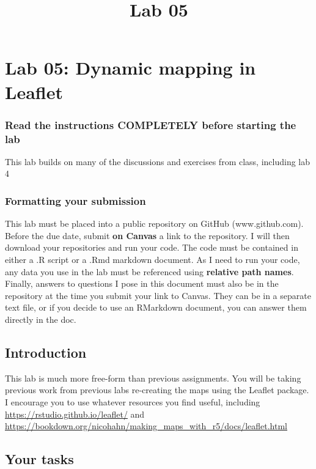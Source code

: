 \documentclass[]{article}
\title{Lab 05}
\author{}
\date{}
\makeatletter
\renewcommand{\maketitle}{\bgroup\vspace*{-1cm}\setlength{\parindent}{0pt}
\begin{flushleft}
  \@author
  
  \@date
  
\end{flushleft}\egroup
}
\makeatother
\begin{document}
\maketitle

\section{Lab 05: Dynamic mapping in
Leaflet}\label{lab-05-dynamic-mapping-in-leaflet}

\subsubsection{Read the instructions COMPLETELY before starting the
lab}\label{read-the-instructions-completely-before-starting-the-lab}

This lab builds on many of the discussions and exercises from class,
including lab 4

\subsubsection{Formatting your
submission}\label{formatting-your-submission}

This lab must be placed into a public repository on GitHub
(www.github.com). Before the due date, submit \textbf{on Canvas} a link
to the repository. I will then download your repositories and run your
code. The code must be contained in either a .R script or a .Rmd
markdown document. As I need to run your code, any data you use in the
lab must be referenced using \textbf{relative path names}. Finally,
answers to questions I pose in this document must also be in the
repository at the time you submit your link to Canvas. They can be in a
separate text file, or if you decide to use an RMarkdown document, you
can answer them directly in the doc.

\subsection{Introduction}\label{introduction}

This lab is much more free-form than previous assignments. You will be
taking previous work from previous labs re-creating the maps using the
Leaflet package. I encourage you to use whatever resources you find
useful, including \url{https://rstudio.github.io/leaflet/} and
\url{https://bookdown.org/nicohahn/making_maps_with_r5/docs/leaflet.html}

\subsection{Your tasks}\label{your-tasks}
\end{document}
